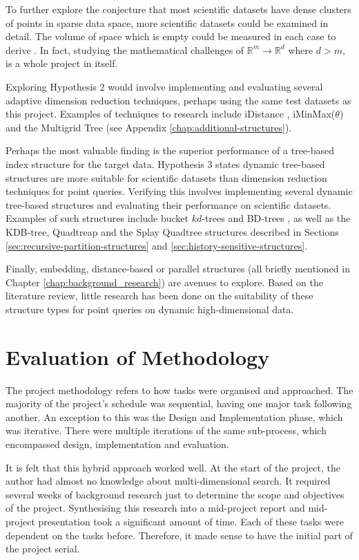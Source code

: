To further explore the conjecture that most scientific datasets have dense clusters of points in sparse data space, more scientific datasets could be examined in detail. The volume of space which is empty could be measured in each case to derive . In fact, studying the mathematical challenges of $\mathbb{R}^m \rightarrow \mathbb{R}^d$ where $d > m$, is a whole project in itself.

Exploring Hypothesis 2 would involve implementing and evaluating several adaptive dimension reduction techniques, perhaps using the same test datasets as this project. Examples of techniques to research include iDistance \cite{idistance}, iMinMax($\theta$) and the Multigrid Tree (see Appendix \ref{chap:additional-structures}).

Perhaps the most valuable finding is the superior performance of a tree-based index structure for the target data. Hypothesis 3 states dynamic tree-based structures are more suitable for scientific datasets than dimension reduction techniques for point queries. Verifying this involves implementing several dynamic tree-based structures and evaluating their performance on scientific datasets. Examples of such structures include bucket $kd$-trees and BD-trees \cite{kdtree-v-bdtree}, as well as the KDB-tree, Quadtreap and the Splay Quadtree structures described in Sections \ref{sec:recursive-partition-structures} and \ref{sec:history-sensitive-structures}.

Finally, embedding, distance-based or parallel structures (all briefly mentioned in Chapter \ref{chap:background_research}) are avenues to explore. Based on the literature review, little research has been done on the suitability of these structure types for point queries on dynamic high-dimensional data.

\section{Evaluation of Methodology}

The project methodology refers to how tasks were organised and approached. The majority of the project's schedule was sequential, having one major task following another. An exception to this was the Design and Implementation phase, which was iterative. There were multiple iterations of the same sub-process, which encompassed design, implementation and evaluation. 

It is felt that this hybrid approach worked well. At the start of the project, the author had almost no knowledge about multi-dimensional search. It required several weeks of background research just to determine the scope and objectives of the project. Synthesising this research into a mid-project report and mid-project presentation took a significant amount of time. Each of these tasks were dependent on the tasks before. Therefore, it made sense to have the initial part of the project serial.

